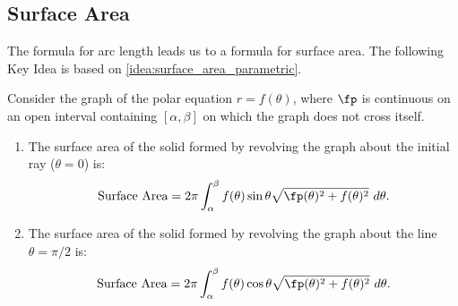 \subsection*{Surface Area}

The formula for arc length leads us to a formula for surface area. The following Key Idea is based on \autoref{idea:surface_area_parametric}.

{Consider the graph of the polar equation $r=f(\theta)$, where $\fp$ is continuous on an open interval containing $[\alpha,\beta]$ on which the graph does not cross itself.
\begin{enumerate}
	\item The surface area of the solid formed by revolving the graph about the initial ray ($\theta=0$) is:
	$$\text{Surface Area} = 2\pi\int_\alpha^\beta f(\theta)\sin\theta\sqrt{\fp(\theta)^2+f(\theta)^2}\ d\theta.$$
	\item The surface area of the solid formed by revolving the graph about the line $\theta=\pi/2$ is:
	$$\text{Surface Area} = 2\pi\int_\alpha^\beta f(\theta)\cos\theta\sqrt{\fp(\theta)^2+f(\theta)^2}\ d\theta.$$
\end{enumerate}}

